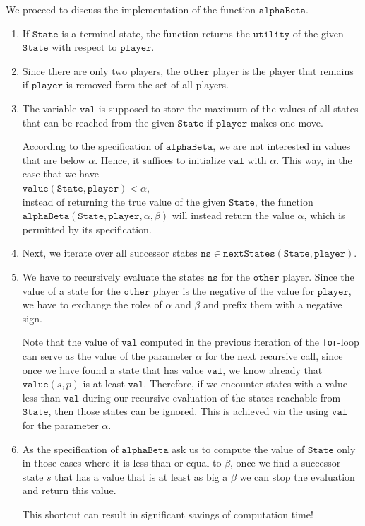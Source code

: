 We proceed to discuss the implementation of the function $\mathtt{alphaBeta}$.
\begin{enumerate}
\item If $\mathtt{State}$ is a terminal state, the function returns the $\mathtt{utility}$ of the given
      $\mathtt{State}$ with respect to $\mathtt{player}$.
\item Since there are only two players, the $\mathtt{other}$ player is the player 
      that remains if $\mathtt{player}$ is removed form the set of all players.
\item The variable $\mathtt{val}$ is supposed to store the maximum of the values of all states
      that can be reached from the given $\mathtt{State}$ if $\mathtt{player}$ makes one move.
      
      According to the specification of $\mathtt{alphaBeta}$,  we are not interested in values that are below
      $\alpha$.  Hence, it suffices to initialize $\mathtt{val}$ with $\alpha$.   This way, in the case that we have
      \\[0.2cm]
      \hspace*{1.3cm}
      $\mathtt{value}(\mathtt{State},\mathtt{player}) < \alpha$,
      \\[0.2cm]
      instead of returning the true value of the given $\mathtt{State}$, the function
      $\mathtt{alphaBeta}(\mathtt{State},\mathtt{player},\alpha,\beta)$ will instead return the value $\alpha$, which is permitted by its specification.
\item Next, we iterate over all successor states $\mathtt{ns} \in \mathtt{nextStates}(\mathtt{State}, \mathtt{player})$.
\item We have to recursively evaluate the states $\mathtt{ns}$ for the $\mathtt{other}$ player.
      Since the value of a state for the $\mathtt{other}$ player is the negative of the value for
      $\mathtt{player}$, we have to exchange the roles of $\alpha$ and $\beta$ and prefix them with a negative
      sign.

      Note that the value of $\mathtt{val}$ computed in the previous iteration of the \texttt{for}-loop 
      can serve as the value of the parameter $\alpha$ for the next recursive call, since once we have found a 
      state that has value $\mathtt{val}$, we know already that $\mathtt{value}(s,p)$ is at least
      $\mathtt{val}$.  Therefore,  if we encounter states with a value
      less than $\mathtt{val}$ during our recursive evaluation of the states reachable from $\mathtt{State}$,
      then those states can be ignored.   This is achieved via the using $\mathtt{val}$ for the parameter $\alpha$.
\item As the specification of $\mathtt{alphaBeta}$ ask us to compute the value of $\mathtt{State}$ only in
      those cases where it is less than or equal to $\beta$, once we find a successor state $s$ that has a
      value that is at least as big a $\beta$ we can stop the evaluation and return this value.

      {\color{red}This shortcut can result in significant savings of computation time!}
\end{enumerate}

